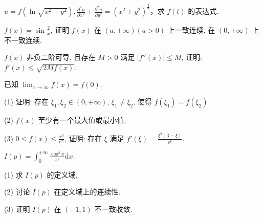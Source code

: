 \par{}
$u = f\left(\ln \sqrt{x^2 + y^2}\right), \frac{\partial^2 u}{\partial x^2} + \frac{\partial^2 u}{\partial y^2} = (x^2 + y^2)^{\frac{3}{2}}$，求 $f(t)$ 的表达式.\par
\par{}
$f(x) = \sin \frac{2}{x}$, 证明 $f(x)$ 在 $(a, +\infty)(a > 0)$ 上一致连续, 在 $(0, +\infty)$ 上不一致连续.\par
\par{}
$f(x)$ 非负二阶可导, 且存在 $M > 0$ 满足 $|f''(x)| \leq M$, 证明: $f'(x) \leq \sqrt{2Mf(x)}$.\par
\par{}
已知 $\lim_{x\to \infty}f(x) = f(0)$.\par
(1) 证明: 存在 $\xi_1, \xi_2 \in (0, +\infty)$, $\xi_1 \neq \xi_2$, 使得 $f(\xi_1) = f(\xi_2)$.\par
(2) $f(x)$ 至少有一个最大值或最小值.\par
(3) $0 \leq f(x) \leq \frac{x^3}{e^x}$, 证明: 存在 $\xi$ 满足 $f'(\xi) = \frac{\xi^2(3 - \xi)}{e^\xi}$.\par
\par{}
$I(p) = \int_{0}^{+\infty}\frac{\cos^{2}x}{x^{p}}\mathrm{d}x.$\par
(1) 求 $I(p)$ 的定义域.\par
(2) 讨论 $I(p)$ 在定义域上的连续性.\par
(3) 证明 $I(p)$ 在 $(-1, 1)$ 不一致收敛.\par
